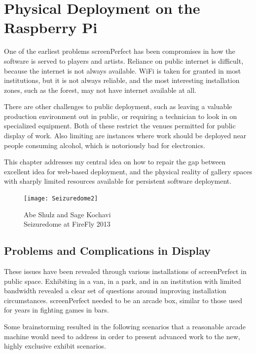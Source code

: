 \section{Physical Deployment on the Raspberry Pi}
One of the earliest problems screenPerfect has been compromises in how the software is served to players and artists. Reliance on public internet is difficult, because the internet is not always available. WiFi is taken for granted in most institutions, but it is not always reliable, and the most interesting installation zones, such as the forest, may not have internet available at all. 

There are other challenges to public deployment, such as leaving a valuable production environment out in public, or requiring a technician to look in on specialized equipment. Both of these restrict the venues permitted for public display of work. Also limiting are instances where work should be deployed near people consuming alcohol, which is notoriously bad for electronics.

This chapter addresses my central idea on how to repair the gap between excellent idea for web-based deployment, and the physical reality of gallery spaces with sharply limited resources available for persistent software deployment. 


\newpage
\begin{figure}[h!]
 \centering
  \texttt{[image: Seizuredome2]}
  \caption{Abe Shulz and Sage Kochavi\\Seizuredome at FireFly 2013}
\end{figure}
\newpage

\subsection{Problems and Complications in Display}
These issues have been revealed through various installations of screenPerfect in public space. Exhibiting in a van, in a park, and in an institution with limited bandwidth revealed a clear set of questions around improving installation circumstances. screenPerfect needed to be an arcade box, similar to those used for years in fighting games in bars.
 
Some brainstorming resulted in the following scenarios that a reasonable arcade machine would need to address in order to present advanced work to the new, highly exclusive exhibit scenarios. 

